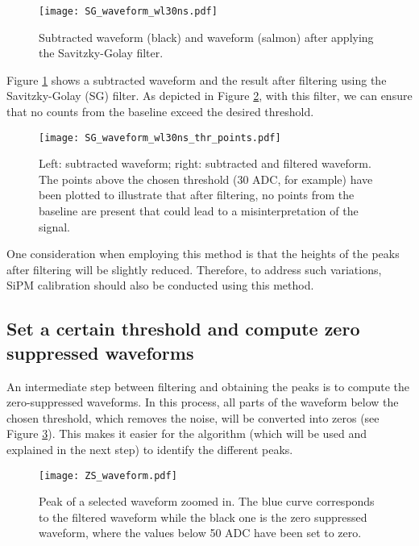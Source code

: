 \documentclass[11pt,a4paper,english,oneside, pdf]{article}
\begin{document}
	\begin{figure}[!h]
		\begin{center}
			\texttt{[image: SG\_waveform\_wl30ns.pdf]}
			\caption{Subtracted waveform (black) and waveform (salmon) after applying the Savitzky-Golay filter.}
			\label{fig:SG_waveform}
		\end{center}
	\end{figure}
	
	Figure \ref{fig:SG_waveform} shows a subtracted waveform and the result after filtering using the Savitzky-Golay (SG) filter. As depicted in Figure \ref{fig:SG_waveform_thr}, with this filter, we can ensure that no counts from the baseline exceed the desired threshold.
	
	\begin{figure}[!h]
		\begin{center}
			\texttt{[image: SG\_waveform\_wl30ns\_thr\_points.pdf]}
			\caption{Left: subtracted waveform; right: subtracted and filtered waveform. The points above the chosen threshold (30 ADC, for example) have been plotted to illustrate that after filtering, no points from the baseline are present that could lead to a misinterpretation of the signal.}
			\label{fig:SG_waveform_thr}
		\end{center}
	\end{figure}
	
	One consideration when employing this method is that the heights of the peaks after filtering will be slightly reduced. Therefore, to address such variations, SiPM calibration should also be conducted using this method.
	
	\subsection*{Set a certain threshold and compute zero suppressed waveforms}
	
	An intermediate step between filtering and obtaining the peaks is to compute the zero-suppressed waveforms. In this process, all parts of the waveform below the chosen threshold, which removes the noise, will be converted into zeros (see Figure \ref{fig:ZS_waveform}). This makes it easier for the algorithm (which will be used and explained in the next step) to identify the different peaks.
	
	\begin{figure}[!h]
		\begin{center}
			\texttt{[image: ZS\_waveform.pdf]}
			\caption{Peak of a selected waveform zoomed in. The blue curve corresponds to the filtered waveform while the black one is the zero suppressed waveform, where the values below 50 ADC have been set to zero.}
			\label{fig:ZS_waveform}
		\end{center}
	\end{figure}
	
\end{document}
